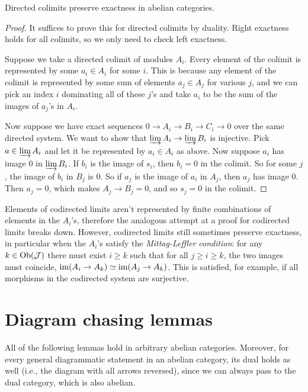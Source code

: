 \begin{prop}\label{prop direct limits preserve exactness}
    Directed colimits preserve exactness in abelian categories.
\end{prop}
\begin{proof}
    It suffices to prove this for directed colimits by duality. Right exactness holds for all colimits, so we only need to check left exactness.
    
    Suppose we take a directed colimit of modules $A_i$. Every element of the colimit is represented by some $a_i\in A_i$ for some $i$. This is because any element of the colimit is represented by some sum of elements $a_j\in A_j$ for various $j$, and we can pick an index $i$ dominating all of these $j$'s and take $a_i$ to be the sum of the images of $a_j$'s in $A_i$.

    Now suppose we have exact sequences $0\to A_i\to B_i\to C_i\to 0$ over the same directed system. We want to show that $\varinjlim A_i\to \varinjlim B_i$ is injective. Pick $a\in\varinjlim A_i$ and let it be represented by $a_i\in A_i$ as above. Now suppose $a_i$ has image $0$ in $\varinjlim B_i$. If $b_i$ is the image of $s_i$, then $b_i=0$ in the colimit. So for some $j$, the image of $b_i$ in $B_j$ is $0$. So if $a_j$ is the image of $a_i$ in $A_j$, then $a_j$ has image $0$. Then $a_j=0$, which makes $A_j\to B_j=0$, and so $s_j=0$ in the colimit.
\end{proof}
\begin{rem}
    Elements of codirected limits aren't represented by finite combinations of elements in the $A_i$'s, therefore the analogous attempt at a proof for codirected limits breaks down. However, codirected limits still sometimes preserve exactness, in particular when the $A_i$'s satisfy the \emph{Mittag-Leffler condition}: for any $k\in \operatorname{Ob}(\mathcal{J})$ there must exist $i\geq k$ such that for all $j\geq i\geq k$, the two images must coincide, $\operatorname{im}(A_i\to A_k)\simeq \operatorname{im}(A_j\to A_k)$. This is satisfied, for example, if all morphisms in the codirected system are surjective.
\end{rem}




\section{Diagram chasing lemmas}

All of the following lemmas hold in arbitrary abelian categories. Moreover, for every general diagrammatic statement in an abelian category, its dual holds as well (i.e., the diagram with all arrows reversed), since we can always pass to the dual category, which is also abelian.

